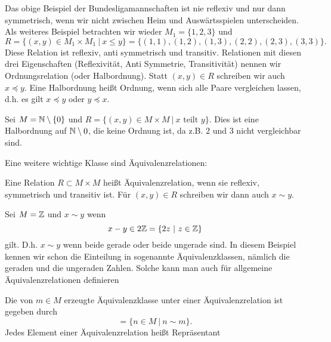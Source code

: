 Das obige Beispiel der Bundesligamannschaften ist nie reflexiv und nur dann symmetrisch, wenn wir nicht zwischen Heim  und Auswärtsspielen unterscheiden. Als weiteres Beispiel betrachten wir wieder \(M_1 = \{1,2,3\}\) und
\begin{equation*}
 R=\{(x,y) \in M_1 \times M_1~|~x \leq y\} = \{ (1,1),(1,2),(1,3),(2,2),(2,3),(3,3)\}.
\end{equation*}
Diese Relation ist reflexiv, anti symmetrisch und transitiv.
Relationen mit diesen drei Eigenschaften (Reflexivität, Anti Symmetrie, Transitivität) nennen wir Ordnungsrelation (oder Halbordnung). Statt \((x,y) \in R\) schreiben wir auch \(x \preceq y\). Eine Halbordnung heißt Ordnung, wenn sich alle Paare vergleichen lassen, d.h. es gilt \(x \preceq y\) oder \(y \preceq x\).
\label{grundlagen/mengenlogik:example-5}
\begin{example}{}{}



Sei \(M= \mathbb{N} \setminus \{0\}\) und \(R=\{(x,y) \in M \times M~|~x \text{ teilt } y\}\). Dies ist eine Halbordnung auf \(\mathbb{N} \setminus 0\), die keine Ordnung ist, da z.B. \(2\) und \(3\) nicht vergleichbar sind.
\end{example}

Eine weitere wichtige Klasse sind Äquivalenzrelationen:
\label{grundlagen/mengenlogik:definition-6}
\begin{definition}{}{}



Eine Relation \(R \subset M \times M\) heißt Äquivalenzrelation, wenn sie reflexiv, symmetrisch und transitiv ist. Für \((x,y) \in R\) schreiben wir dann auch \(x \sim y\).
\end{definition}
\label{grundlagen/mengenlogik:example-7}
\begin{example}{}{}



Sei \(M= \mathbb{Z}\) und \(x \sim y\) wenn
\begin{equation*}
x-y \in 2 \mathbb{Z} = \{ 2 z ~|~z \in \mathbb{Z} \}
\end{equation*}
gilt. D.h. \(x \sim y\) wenn beide gerade oder beide ungerade sind. In diesem Beispiel kennen wir schon die Einteilung in sogenannte Äquivalenzklassen, nämlich die geraden und die ungeraden Zahlen. Solche kann man auch für allgemeine Äquivalenzrelationen definieren
\end{example}
\label{grundlagen/mengenlogik:definition-8}
\begin{definition}{}{}



Die von \(m \in M\) erzeugte Äquivalenzklasse unter einer Äquivalenzrelation ist gegeben durch
\begin{equation*}
 [m] = \{ n \in M ~|~n \sim m\}.
\end{equation*}
Jedes Element einer Äquivalenzrelation heißt Repräsentant
\end{definition}

